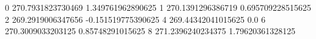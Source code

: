 0 270.7931823730469 1.349761962890625
1 270.1391296386719 0.695709228515625
2 269.2919006347656 -0.151519775390625
4 269.44342041015625 0.0
6 270.3009033203125 0.85748291015625
8 271.2396240234375 1.79620361328125
